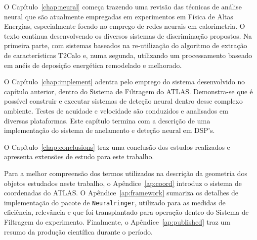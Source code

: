O Capítulo~\ref{chap:neural} começa trazendo uma revisão das técnicas de
análise neural que são atualmente empregadas em experimentos em Física de
Altas Energias, especialmente focado no emprego de redes neurais em
calorimetria. O texto continua desenvolvendo os diversos sistemas de
discriminação propostos. Na primeira parte, com sistemas baseados na
re-utilização do algoritmo de extração de características T2Calo e, numa
segunda, utilizando um processamento baseado em anéis de deposição energética
remodelado e melhorado.

O Capítulo~\ref{chap:implement} adentra pelo emprego do sistema desenvolvido
no capítulo anterior, dentro do Sistema de Filtragem do ATLAS. Demonstra-se
que é possível construir e executar sistemas de deteção neural dentro desse
complexo ambiente. Testes de acuidade e velocidade são conduzidos e analisados
em diversas plataformas. Este capítulo termina com a descrição de uma
implementação do sistema de anelamento e deteção neural em DSP's.

O Capítulo~\ref{chap:conclusions} traz uma conclusão dos estudos realizados e
apresenta extensões de estudo para este trabalho.

Para a melhor compreensão dos termos utilizados na descrição da geometria dos
objetos estudados neste trabalho, o Apêndice~\ref{ap:coord} introduz o sistema
de coordenadas do ATLAS. O Apêndice~\ref{ap:framework} sumariza os detalhes de
implementação do pacote de  \texttt{Neuralringer}, utilizado
para as medidas de eficiência, relevância e que foi transplantado para
operação dentro do Sistema de Filtragem do experimento. Finalmente, o
Apêndice~\ref{ap:published} traz um resumo da produção científica durante o
período.

